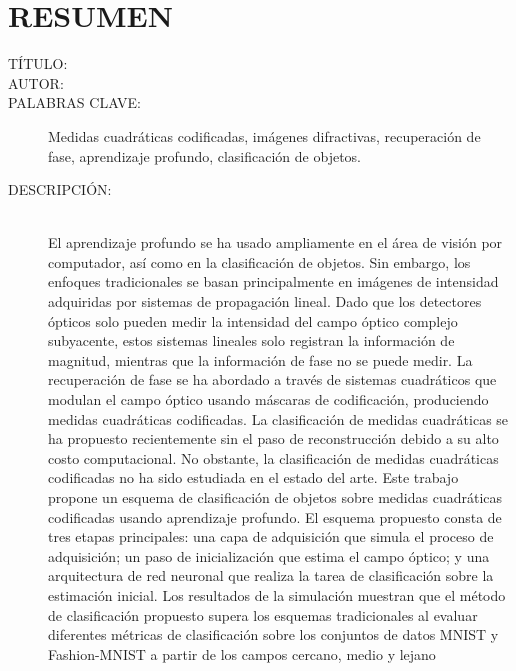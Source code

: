 \chapter*{RESUMEN}

\footnotesize{
\begin{description}
  \item[TÍTULO:] \MakeUppercase{\titulo}
  \item[AUTOR:]\MakeUppercase{\autor} 
  \item[PALABRAS CLAVE:] Medidas cuadráticas codificadas, imágenes difractivas, recuperación de fase, aprendizaje profundo, clasificación de objetos.
  \item[DESCRIPCIÓN:]\hfill \\ El aprendizaje profundo se ha usado ampliamente en el área de visión por computador, así como en la clasificación de objetos. Sin embargo, los enfoques tradicionales se basan principalmente en imágenes de intensidad adquiridas por sistemas de propagación lineal. Dado que los detectores ópticos solo pueden medir la intensidad del campo óptico complejo subyacente, estos sistemas lineales solo registran la información de magnitud, mientras que la información de fase no se puede medir. La recuperación de fase se ha abordado a través de sistemas cuadráticos que modulan el campo óptico usando máscaras de codificación, produciendo medidas cuadráticas codificadas. La clasificación de medidas cuadráticas se ha propuesto recientemente sin el paso de reconstrucción debido a su alto costo computacional. No obstante, la clasificación de medidas cuadráticas codificadas no ha sido estudiada en el estado del arte. Este trabajo propone un esquema de clasificación de objetos sobre medidas cuadráticas codificadas usando aprendizaje profundo. El esquema propuesto consta de tres etapas principales: una capa de adquisición que simula el proceso de adquisición; un paso de inicialización que estima el campo óptico; y una arquitectura de red neuronal que realiza la tarea de clasificación sobre la estimación inicial. Los resultados de la simulación muestran que el método de clasificación propuesto supera los esquemas tradicionales al evaluar diferentes métricas de clasificación sobre los conjuntos de datos MNIST y Fashion-MNIST a partir de los campos cercano, medio y lejano
\end{description}}\normalsize
